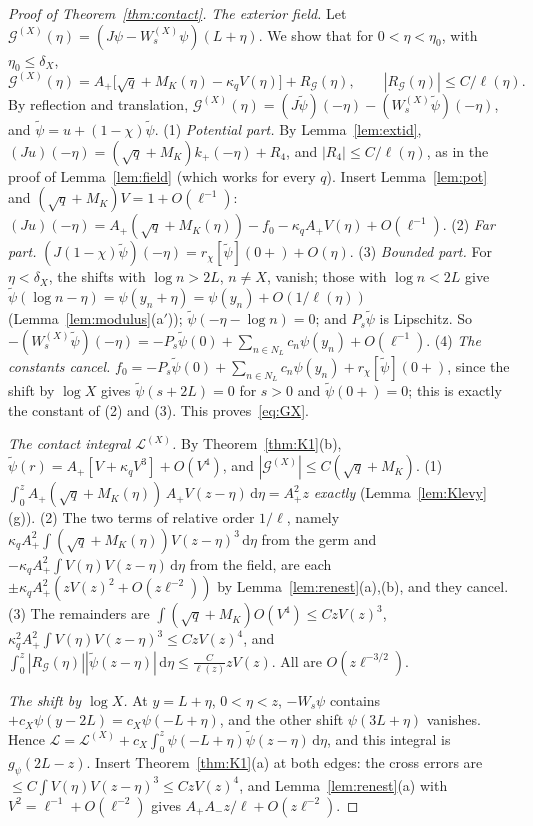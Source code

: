 \documentclass[11pt]{amsart}
\newcommand{\cL}{\mathcal{L}}
\newcommand{\dd}{\,\mathrm{d}}
\theoremstyle{definition}
\theoremstyle{remark}
\numberwithin{equation}{section}
\begin{document}
\begin{proof}[Proof of Theorem~\ref{thm:contact}]
\emph{The exterior field.} Let $\mathcal G^{(X)}(\eta)=(J\psi-W^{(X)}_s\psi)(L+\eta)$. We show that for $0<\eta<\eta_0$, with $\eta_0\le\delta_X$,
\begin{equation}\label{eq:GX}
\mathcal G^{(X)}(\eta)=A_+\bigl[\sqrt q+M_K(\eta)-\kappa_qV(\eta)\bigr]+R_{\mathcal G}(\eta),\qquad|R_{\mathcal G}(\eta)|\le C/\ell(\eta).
\end{equation}
By reflection and translation, $\mathcal G^{(X)}(\eta)=(J\tilde\psi)(-\eta)-(W^{(X)}_s\tilde\psi)(-\eta)$, and $\tilde\psi=u+(1-\chi)\tilde\psi$.
(1) \emph{Potential part.} By Lemma~\ref{lem:extid}, $(Ju)(-\eta)=(\sqrt q+M_K)k_+(-\eta)+R_4$, and $|R_4|\le C/\ell(\eta)$, as in the proof of Lemma~\ref{lem:field} (which works for every $q$). Insert Lemma~\ref{lem:pot} and $(\sqrt q+M_K)V=1+O(\ell^{-1})$: $(Ju)(-\eta)=A_+(\sqrt q+M_K(\eta))-f_0-\kappa_qA_+V(\eta)+O(\ell^{-1})$.
(2) \emph{Far part.} $(J(1-\chi)\tilde\psi)(-\eta)=r_\chi[\tilde\psi](0+)+O(\eta)$.
(3) \emph{Bounded part.} For $\eta<\delta_X$, the shifts with $\log n>2L$, $n\ne X$, vanish; those with $\log n<2L$ give $\tilde\psi(\log n-\eta)=\psi(y_n+\eta)=\psi(y_n)+O(1/\ell(\eta))$ (Lemma~\ref{lem:modulus}(a$'$)); $\tilde\psi(-\eta-\log n)=0$; and $P_s\tilde\psi$ is Lipschitz. So $-(W^{(X)}_s\tilde\psi)(-\eta)=-P_s\tilde\psi(0)+\sum_{n\in N_L}c_n\psi(y_n)+O(\ell^{-1})$.
(4) \emph{The constants cancel.} $f_0=-P_s\tilde\psi(0)+\sum_{n\in N_L}c_n\psi(y_n)+r_\chi[\tilde\psi](0+)$, since the shift by $\log X$ gives $\tilde\psi(s+2L)=0$ for $s>0$ and $\tilde\psi(0+)=0$; this is exactly the constant of (2) and (3). This proves~\eqref{eq:GX}.

\emph{The contact integral $\cL^{(X)}$.} By Theorem~\ref{thm:K1}(b), $\tilde\psi(r)=A_+[V+\kappa_qV^3]+O(V^4)$, and $|\mathcal G^{(X)}|\le C(\sqrt q+M_K)$. (1) $\int_0^zA_+(\sqrt q+M_K(\eta))\,A_+V(z-\eta)\dd\eta=A_+^2z$ \emph{exactly} (Lemma~\ref{lem:Klevy}(g)). (2) The two terms of relative order $1/\ell$, namely $\kappa_qA_+^2\int(\sqrt q+M_K(\eta))V(z-\eta)^3\dd\eta$ from the germ and $-\kappa_qA_+^2\int V(\eta)V(z-\eta)\dd\eta$ from the field, are each $\pm\kappa_qA_+^2(zV(z)^2+O(z\ell^{-2}))$ by Lemma~\ref{lem:renest}(a),(b), and they cancel. (3) The remainders are $\int(\sqrt q+M_K)O(V^4)\le CzV(z)^3$, $\kappa_q^2A_+^2\int V(\eta)V(z-\eta)^3\le CzV(z)^4$, and $\int_0^z|R_{\mathcal G}(\eta)||\tilde\psi(z-\eta)|\dd\eta\le\frac C{\ell(z)}zV(z)$. All are $O(z\ell^{-3/2})$.

\emph{The shift by $\log X$.} At $y=L+\eta$, $0<\eta<z$, $-W_s\psi$ contains $+c_X\psi(y-2L)=c_X\psi(-L+\eta)$, and the other shift $\psi(3L+\eta)$ vanishes. Hence $\cL=\cL^{(X)}+c_X\int_0^z\psi(-L+\eta)\tilde\psi(z-\eta)\dd\eta$, and this integral is $g_\psi(2L-z)$. Insert Theorem~\ref{thm:K1}(a) at both edges: the cross errors are $\le C\int V(\eta)V(z-\eta)^3\le CzV(z)^4$, and Lemma~\ref{lem:renest}(a) with $V^2=\ell^{-1}+O(\ell^{-2})$ gives $A_+A_-z/\ell+O(z\ell^{-2})$.
\end{proof}
\end{document}
